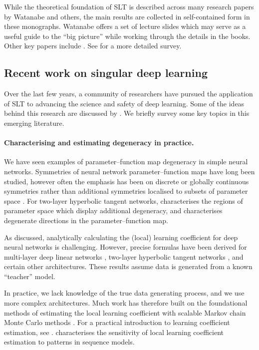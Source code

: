 \documentclass[11pt]{article}
\begin{document}
While the theoretical foundation of SLT is described across many research papers by Watanabe and others, the main results are collected in self-contained form in these monographs. Watanabe offers a set of lecture slides \citep{Watanabe2023} which may serve as a useful guide to the ``big picture'' while working through the details in the books.
Other key papers include \citet{Watanabe2007,Watanabe2013}. See \citet{Watanabe2024survey} for a more detailed survey.

\clearpage

\subsection{Recent work on singular deep learning}

Over the last few years, a community of researchers have pursued the application of SLT to advancing the science and safety of deep learning.
Some of the ideas behind this research are discussed by \citet{Hoogland+2023,Skalse+2023,PepinLehalleur+2025,Furman2026}.
We briefly survey some key topics in this emerging literature.

\paragraph{Characterising and estimating degeneracy in practice.}
We have seen examples of parameter--function map degeneracy in simple neural networks. Symmetries of neural network parameter--function maps have long been studied, however often the emphasis has been on discrete or globally continuous symmetries rather than additional symmetries localised to subsets of parameter space \citep[see][\S 2.3, for a survey]{FarrugiaRoberts2022}.
For two-layer hyperbolic tangent networks, \citet{FarrugiaRoberts2024} characterises the regions of parameter space which display additional degeneracy, and \citet{FarrugiaRoberts2023} characterises degenerate directions in the parameter--function map.

As discussed, analytically calculating the (local) learning coefficient for deep neural networks is challenging. However, precise formulas have been derived for multi-layer deep linear networks \citep{Aoyagi+Watanabe2005,Aoyagi2024}, two-layer hyperbolic tangent networks \citep{Aoyagi2009}, and certain other architectures. These results assume data is generated from a known ``teacher'' model.

In practice, we lack knowledge of the true data generating process, and we use more complex architectures. Much work has therefore built on the foundational methods of estimating the local learning coefficient with scalable Markov chain Monte Carlo methods \citep{Lau+2025,Hitchcock+Hoogland2025}.
For a practical introduction to learning coefficient estimation, see \citet{Furman2023}.
\citet{Chen+Murfet2025} characterises the sensitivity of local learning coefficient estimation to patterns in sequence models.
\end{document}
